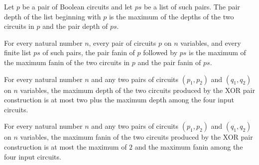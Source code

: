 \begin{theorem}
\label{BoolCircuit.pairDepth_cons}
\leanok
{}
Let $p$ be a pair of Boolean circuits and let $ps$ be a list of such pairs. The pair
depth of the list beginning with $p$ is the maximum of the depths of the two circuits in
$p$ and the pair depth of $ps$.
\end{theorem}

\begin{theorem}
\label{BoolCircuit.pairFanin_cons}
\leanok
{}
For every natural number $n$, every pair of circuits $p$ on $n$ variables, and every
finite list $ps$ of such pairs, the pair fanin of $p$ followed by $ps$ is the maximum of
the maximum fanin of the two circuits in $p$ and the pair fanin of $ps$.
\end{theorem}

\begin{theorem}
\label{BoolCircuit.pairDepth_xorNode}
\leanok
{}
For every natural number $n$ and any two pairs of circuits $(p_1,p_2)$ and $(q_1,q_2)$
on $n$ variables, the maximum depth of the two circuits produced by the XOR pair
construction is at most two plus the maximum depth among the four input circuits.
\end{theorem}

\begin{theorem}
\label{BoolCircuit.pairFanin_xorNode}
\leanok
{}
For every natural number $n$ and any two pairs of circuits $(p_1,p_2)$ and $(q_1,q_2)$
on $n$ variables, the maximum fanin of the two circuits produced by the XOR pair
construction is at most the maximum of $2$ and the maximum fanin among the four input
circuits.
\end{theorem}

